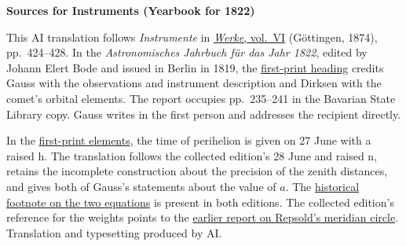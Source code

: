 \clearpage\thispagestyle{empty}
\begin{center}\textbf{Sources for Instruments (Yearbook for 1822)}\end{center}
\noindent This AI translation follows \textit{Instrumente} in \href{https://gdz.sub.uni-goettingen.de/id/PPN236007467}{\textit{Werke}, vol.~VI} (Göttingen, 1874), pp.~424--428. In the \textit{Astronomisches Jahrbuch für das Jahr 1822}, edited by Johann Elert Bode and issued in Berlin in 1819, the \href{https://api.digitale-sammlungen.de/iiif/image/v2/bsb10538351_00241/full/1600,/0/default.jpg}{first-print heading} credits Gauss with the observations and instrument description and Dirksen with the comet’s orbital elements. The report occupies pp.~235--241 in the Bavarian State Library copy. Gauss writes in the first person and addresses the recipient directly.
\par\smallskip\noindent In the \href{https://api.digitale-sammlungen.de/iiif/image/v2/bsb10538351_00242/full/1600,/0/default.jpg}{first-print elements}, the time of perihelion is given on 27 June with a raised h. The translation follows the collected edition’s 28 June and raised n, retains the incomplete construction about the precision of the zenith distances, and gives both of Gauss’s statements about the value of \(a\). The \href{https://api.digitale-sammlungen.de/iiif/image/v2/bsb10538351_00246/full/1600,/0/default.jpg}{historical footnote on the two equations} is present in both editions. The collected edition’s reference for the weights points to the \hyperlink{native-415}{earlier report on Repsold’s meridian circle}. Translation and typesetting produced by AI.
\clearpage
